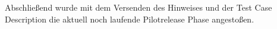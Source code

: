 Abschließend wurde mit dem Versenden des Hinweises und der Test Case Description die aktuell noch laufende Pilotrelease Phase angestoßen. 

